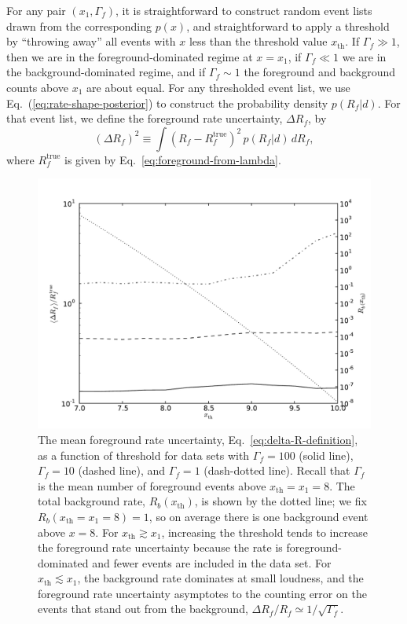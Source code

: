 \documentclass[aps,prd,reprint,nofootinbib]{revtex4-1}
\begin{document}
For any pair $(x_1, \Gamma_f)$, it is straightforward to construct
random event lists drawn from the corresponding $p(x)$, and
straightforward to apply a threshold by ``throwing away'' all events
with $x$ less than the threshold value $x_\mathrm{th}$.  If $\Gamma_f
\gg 1$, then we are in the foreground-dominated regime at $x = x_1$,
if $\Gamma_f \ll 1$ we are in the background-dominated regime, and if
$\Gamma_f \sim 1$ the foreground and background counts above $x_1$
are about equal.  For any thresholded event list, we use
Eq.~(\ref{eq:rate-shape-posterior}) to construct the probability
density $p(R_f|d)$.  For that event list, we define the foreground
rate uncertainty, $\Delta R_f$, by
\begin{equation}
\label{eq:delta-R-definition}
(\Delta R_f)^2 \equiv \int{(R_f - R_f^\mathrm{true})^2 \, p(R_f|d)\, dR_f },
\end{equation}
where $R_f^\mathrm{true}$ is given by
Eq.~\eqref{eq:foreground-from-lambda}.

\begin{figure}
  \includegraphics[width=\columnwidth]{threshold.pdf}
  \caption{\label{fig:threshold-rate-dependence} The mean foreground
    rate uncertainty, Eq.~\eqref{eq:delta-R-definition}, as a function
    of threshold for data sets with $\Gamma_f = 100$ (solid line),
    $\Gamma_f = 10$ (dashed line), and $\Gamma_f = 1$ (dash-dotted
    line).  Recall that $\Gamma_f$ is the mean number of foreground
    events above $x_\mathrm{th}=x_1= 8$.  The total background rate,
    $R_b\left( x_\mathrm{th} \right)$, is shown by the dotted line; we
    fix $R_b \left( x_\mathrm{th} = x_1 = 8\right) = 1$, so on average
    there is one background event above $x = 8$.  For $x_\mathrm{th}
    \gtrsim x_1$, increasing the threshold tends to increase the
    foreground rate uncertainty because the rate is
    foreground-dominated and fewer events are included in the data
    set.  For $x_\mathrm{th} \lesssim x_1$, the background rate
    dominates at small loudness, and the foreground rate uncertainty
    asymptotes to the counting error on the events that stand out from
    the background, $\Delta R_f / R_f \simeq 1/\sqrt{\Gamma_f}$.}
\end{figure}
\end{document}
